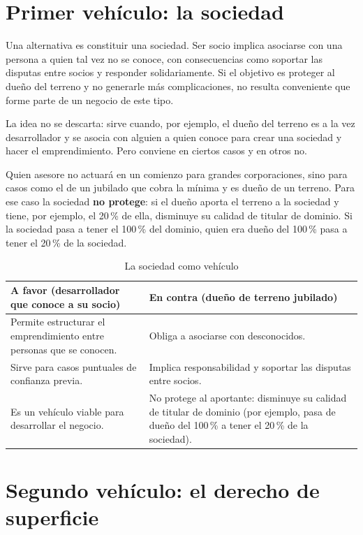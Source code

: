 \documentclass[12pt,oneside]{book}
\begin{document}
\section{Primer vehículo: la sociedad}

Una alternativa es constituir una sociedad. Ser socio implica asociarse con una persona a quien tal vez no se conoce, con consecuencias como soportar las disputas entre socios y responder solidariamente. Si el objetivo es proteger al dueño del terreno y no generarle más complicaciones, no resulta conveniente que forme parte de un negocio de este tipo.

La idea no se descarta: sirve cuando, por ejemplo, el dueño del terreno es a la vez desarrollador y se asocia con alguien a quien conoce para crear una sociedad y hacer el emprendimiento. Pero conviene en ciertos casos y en otros no.

Quien asesore no actuará en un comienzo para grandes corporaciones, sino para casos como el de un jubilado que cobra la mínima y es dueño de un terreno. Para ese caso la sociedad \textbf{no protege}: si el dueño aporta el terreno a la sociedad y tiene, por ejemplo, el 20\,\% de ella, disminuye su calidad de titular de dominio. Si la sociedad pasa a tener el 100\,\% del dominio, quien era dueño del 100\,\% pasa a tener el 20\,\% de la sociedad.

\begin{table}[H]
\centering
\small
\begin{tabularx}{\textwidth}{YY}
\toprule
\textbf{A favor (desarrollador que conoce a su socio)} & \textbf{En contra (dueño de terreno jubilado)} \\
\midrule
Permite estructurar el emprendimiento entre personas que se conocen. & Obliga a asociarse con desconocidos. \\
Sirve para casos puntuales de confianza previa. & Implica responsabilidad y soportar las disputas entre socios. \\
Es un vehículo viable para desarrollar el negocio. & No protege al aportante: disminuye su calidad de titular de dominio (por ejemplo, pasa de dueño del 100\,\% a tener el 20\,\% de la sociedad). \\
\bottomrule
\end{tabularx}
\caption{La sociedad como vehículo}
\end{table}

\section{Segundo vehículo: el derecho de superficie}
\end{document}
